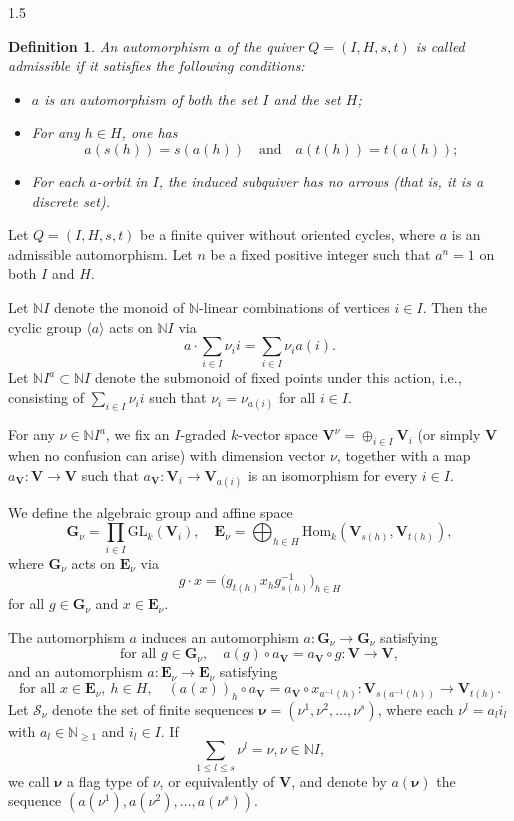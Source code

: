 \documentclass[10pt]{amsart}
\newtheorem{definition}[theorem]{Definition}
\def\bbN{{\mathbb N}}  \def\bbZ{{\mathbb Z}}  \def\bbQ{{\mathbb Q}}
\def\bfV{{\mathbf V}}
\def\bfV{\mathbf{V}}
\begin{document}
\begin{spacing}{1.5}
\begin{definition}
   An automorphism $a$ of the quiver $Q = (I, H, s, t)$ is called \emph{admissible} if it satisfies the following conditions:
\begin{itemize}
    \item $a$ is an automorphism of both the set $I$ and the set $H$;
    \item For any $h \in H$, one has
    \[
    a(s(h)) = s(a(h)) \quad \text{and} \quad a(t(h)) = t(a(h));
    \]
    \item For each $a$-orbit in $I$, the induced subquiver has no arrows (that is, it is a discrete set).
\end{itemize}
\end{definition}

Let $Q = (I, H, s, t)$ be a finite quiver without oriented cycles, where $a$ is an admissible automorphism. Let $n$ be a fixed positive integer such that $a^n = 1$ on both $I$ and $H$.

Let $\mathbb{N}I$ denote the monoid of $\mathbb{N}$-linear combinations of vertices $i \in I$. Then the cyclic group $\langle a \rangle$ acts on $\mathbb{N}I$ via
\[
a \cdot \sum_{i \in I} \nu_i i = \sum_{i \in I} \nu_{i} a(i).
\]
Let $\mathbb{N}I^a \subset \mathbb{N}I$ denote the submonoid of fixed points under this action, i.e., consisting of $\sum_{i \in I} \nu_i i$ such that $\nu_i = \nu_{a(i)}$ for all $i \in I$.

For any $\nu \in \mathbb{N}I^a$, we fix an $I$-graded $k$-vector space $\mathbf{V}^\nu=\oplus_{i\in I}\bfV_i$ (or simply $\mathbf{V}$ when no confusion can arise) with dimension vector $\nu$, together with a map $a_{\bfV}:\bfV\rightarrow \bfV$ such that $a_{\bfV}:\bfV_i\rightarrow \bfV_{a(i)}$ is an isomorphism for every $i\in I$.

We define the algebraic group and affine space
\[
\mathbf{G}_{\nu} = \prod_{i \in I} \mathrm{GL}_k(\mathbf{V}_i), \quad
\mathbf{E}_{\nu} = \bigoplus_{h \in H} \mathrm{Hom}_k(\mathbf{V}_{s(h)}, \mathbf{V}_{t(h)}),
\]
where $\mathbf{G}_{\nu}$ acts on $\mathbf{E}_{\nu}$ via
\[
g \cdot x = \bigl(g_{t(h)} x_h g_{s(h)}^{-1}\bigr)_{h \in H}
\]
for all $g \in \mathbf{G}_{\nu}$ and $x \in \mathbf{E}_{\nu}$.

The automorphism $a$ induces an automorphism $a : \mathbf{G}_{\nu} \to \mathbf{G}_{\nu}$ satisfying
\[
\text{for all } g \in \mathbf{G}_{\nu}, \quad a(g) \circ a_{\mathbf{V}} = a_{\mathbf{V}} \circ g : \mathbf{V} \to \mathbf{V},
\]
and an automorphism $a : \mathbf{E}_{\nu} \to \mathbf{E}_{\nu}$ satisfying
\[
\text{for all } x \in \mathbf{E}_{\nu}, \ h \in H, \quad (a(x))_{h} \circ a_{\mathbf{V}} = a_{\mathbf{V}} \circ x_{a^{-1}(h)} : \mathbf{V}_{s(a^{-1}(h))} \to \mathbf{V}_{t(h)}.
\]
Let $\mathcal{S}_{\nu}$ denote the set of finite sequences $\boldsymbol{\nu} = (\nu^{1}, \nu^{2}, \ldots, \nu^{s})$, where each $\nu^{l} = a_{l} i_{l}$ with $a_{l} \in \mathbb{N}_{\geqslant 1}$ and $i_{l} \in I$. If
\[
\sum_{1 \leqslant l \leqslant s} \nu^{l} = \nu, \nu\in \bbN I,
\]
we call $\boldsymbol{\nu}$ a flag type of $\nu$, or equivalently of $\mathbf{V}$, and denote by $a(\boldsymbol{\nu})$ the sequence $(a(\nu^{1}), a(\nu^{2}), \ldots, a(\nu^{s}))$.


\end{spacing}
\end{document}
